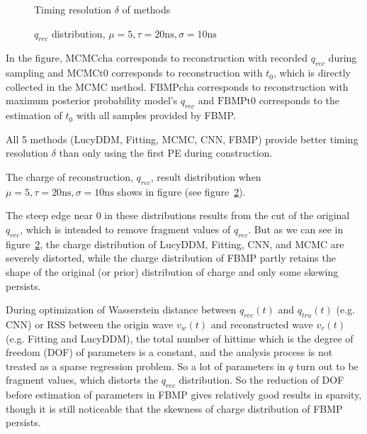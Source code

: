 \begin{figure}[H]
    \centering
    \resizebox{\textwidth}{!}{}
    \caption{\label{fig:deltamethods} Timing resolution $\delta$ of methods}
\end{figure}

\begin{figure}[H]
    \centering
    \resizebox{\textwidth}{!}{}
    \caption{\label{fig:recchargehist}  $q_{rec}$ distribution, $\mu=5, \tau=20\mathrm{ns}, \sigma=10\mathrm{ns}$}
\end{figure}

In the figure, $\mathrm{MCMCcha}$ corresponds to reconstruction with recorded $q_{rec}$ during sampling and $\mathrm{MCMCt0}$ corresponds to reconstruction with $t_{0}$, which is directly collected in the MCMC method. $\mathrm{FBMPcha}$ corresponds to reconstruction with maximum posterior probability model's $q_{rec}$ and $\mathrm{FBMPt0}$ corresponds to the estimation of $t_{0}$ with all samples provided by FBMP. 

All 5 methods (LucyDDM, Fitting, MCMC, CNN, FBMP) provide better timing resolution $\delta$ than only using the first PE during construction. 


The charge of reconstruction, $q_{rec}$, result distribution when $\mu=5, \tau=20\mathrm{ns}, \sigma=10\mathrm{ns}$ shows in figure (see figure~\ref{fig:recchargehist}). 

The steep edge near 0 in these distributions results from the cut of the original $q_{rec}$, which is intended to remove fragment values of $q_{rec}$. But as we can see in figure~\ref{fig:recchargehist}, the charge distribution of LucyDDM, Fitting, CNN, and MCMC are severely distorted, while the charge distribution of FBMP partly retains the shape of the original (or prior) distribution of charge and only some skewing persists. 

During optimization of Wasserstein distance between $q_{rec}(t)$ and $q_{tru}(t)$ (e.g. CNN) or RSS between the origin wave $v_{w}(t)$ and reconstructed wave $v_{r}(t)$ (e.g. Fitting and LucyDDM), the total number of hittime which is the degree of freedom (DOF) of parameters is a constant, and the analysis process is not treated as a sparse regression problem. So a lot of parameters in $q$ turn out to be fragment values, which distorts the $q_{rec}$ distribution. So the reduction of DOF before estimation of parameters in FBMP gives relatively good results in sparsity, though it is still noticeable that the skewness of charge distribution of FBMP persists. 

